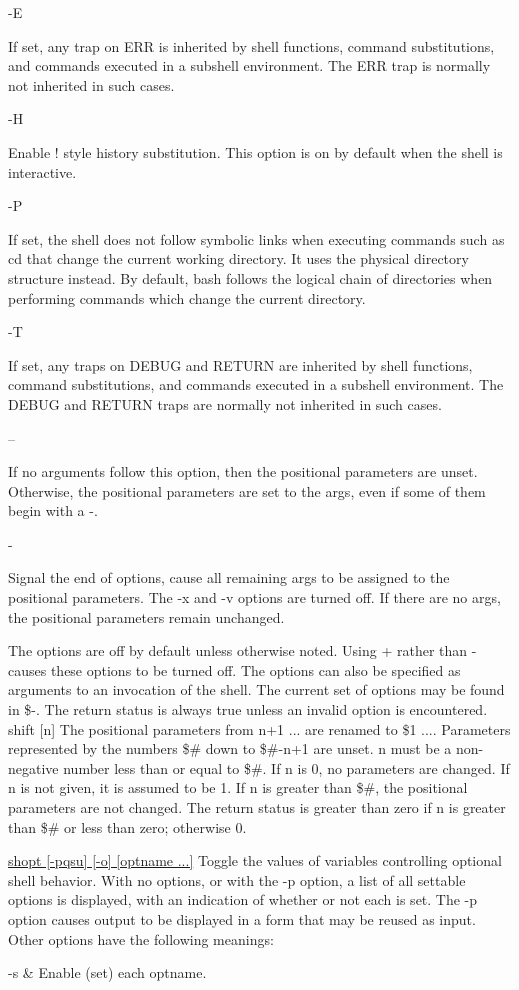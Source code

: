 {{{{{{-E

If set, any trap on ERR is inherited by shell functions, command substitutions, and commands executed in a subshell environment. The ERR trap is normally not inherited in such cases.

-H

Enable ! style history substitution. This option is on by default when the shell is interactive.

-P

If set, the shell does not follow symbolic links when executing commands such as cd that change the current working directory. It uses the physical directory structure instead. By default, bash follows the logical chain of directories when performing commands which change the current directory.

-T

If set, any traps on DEBUG and RETURN are inherited by shell functions, command substitutions, and commands executed in a subshell environment. The DEBUG and RETURN traps are normally not inherited in such cases.

--

If no arguments follow this option, then the positional parameters are unset. Otherwise, the positional parameters are set to the args, even if some of them begin with a -.

-

Signal the end of options, cause all remaining args to be assigned to the positional parameters. The -x and -v options are turned off. If there are no args, the positional parameters remain unchanged.

The options are off by default unless otherwise noted. Using + rather than - causes these options to be turned off. The options can also be specified as arguments to an invocation of the shell. The current set of options may be found in \$-. The return status is always true unless an invalid option is encountered.
shift [n]
The positional parameters from n+1 ... are renamed to \$1 .... Parameters represented by the numbers \$\# down to \$\#-n+1 are unset. n must be a non-negative number less than or equal to \$\#. If n is 0, no parameters are changed. If n is not given, it is assumed to be 1. If n is greater than \$\#, the positional parameters are not changed. The return status is greater than zero if n is greater than \$\# or less than zero; otherwise 0.

\url{shopt [-pqsu] [-o] [optname ...]}
Toggle the values of variables controlling optional shell behavior. With no options, or with the -p option, a list of all settable options is displayed, with an indication of whether or not each is set. The -p option causes output to be displayed in a form that may be reused as input. Other options have the following meanings:
\begin{longtable}
-s &
Enable (set) each optname. \\


\end{longtable}}}}}}}
